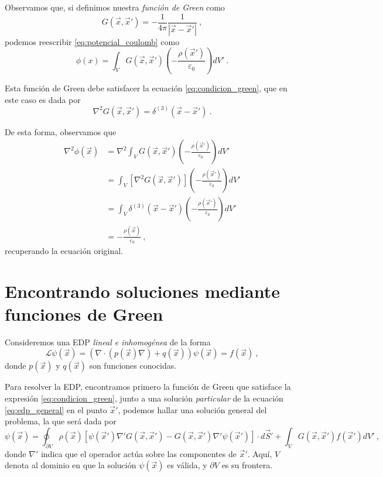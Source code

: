 Observamos que, si definimos nuestra \emph{función de Green} como
\begin{equation}
    G(\vec{x}, \vec{x}') = - \frac{1}{4\pi} \frac{1}{|\vec{x} - \vec{x}'|} \ ,
\end{equation}
podemos reescribir \eqref{eq:potencial_coulomb} como
\begin{equation}
    \phi(x) = \int_V G(\vec{x}, \vec{x}') \left( - \frac{\rho(\vec{x}')}{\varepsilon_0} \right) dV' \ .
\end{equation}

Esta función de Green debe satisfacer la ecuación \eqref{eq:condicion_green}, que en este caso es dada por
\begin{equation}
    \nabla^2 G(\vec{x}, \vec{x}') = \delta^{(3)} (\vec{x} - \vec{x}') \ .
\end{equation}

De esta forma, observamos que
\begin{align}
    \nabla^2 \phi(\vec{x}) & = \nabla^2 \int_V G(\vec{x}, \vec{x}') \left( - \frac{\rho(\vec{x}')}{\varepsilon_0} \right) dV' \\
    & = \int_V [\nabla^2 G(\vec{x}, \vec{x}')] \left( - \frac{\rho(\vec{x}')}{\varepsilon_0} \right) dV' \\
    & = \int_V \delta^{(3)}(\vec{x} - \vec{x}') \left( - \frac{\rho(\vec{x}')}{\varepsilon_0} \right) dV'\\
    & = - \frac{\rho(\vec{x})}{\varepsilon_0} \ ,
\end{align}
recuperando la ecuación original.

\section{Encontrando soluciones mediante funciones de Green}

Consideremos una EDP \emph{lineal e inhomogénea} de la forma
\begin{equation}\label{eq:edp_general}
    \mathcal{L} \psi(\vec{x}) = \left(\nabla \cdot (p(\vec{x}) \nabla) + q(\vec{x})\right)\psi(\vec{x}) = f(\vec{x}) \ ,
\end{equation}
donde $p(\vec{x})$ y $q(\vec{x})$ son funciones conocidas.

Para resolver la EDP, encontramos primero la función de Green que satisface la expresión \eqref{eq:condicion_green}, junto a una solución \emph{particular} de la ecuación \eqref{eq:edp_general} en el punto $\vec{x}'$, podemos hallar una solución general del problema, la que será dada por
\begin{equation}
    \psi(\vec{x}) = \oint_{\partial V} \rho(\vec{x})[\psi(\vec{x}') \nabla' G(\vec{x}, \vec{x}') - G(\vec{x}, \vec{x}') \nabla' \psi(\vec{x}')] \cdot d\vec{S}' + \int_V G(\vec{x}, \vec{x}') f(\vec{x}') dV' \ ,
\end{equation}
donde $\nabla'$ indica que el operador actúa sobre las componentes de $\vec{x}'$. Aquí, $V$ denota al dominio en que la solución $\psi(\vec{x})$ es válida, y $\partial V$ es su frontera.


